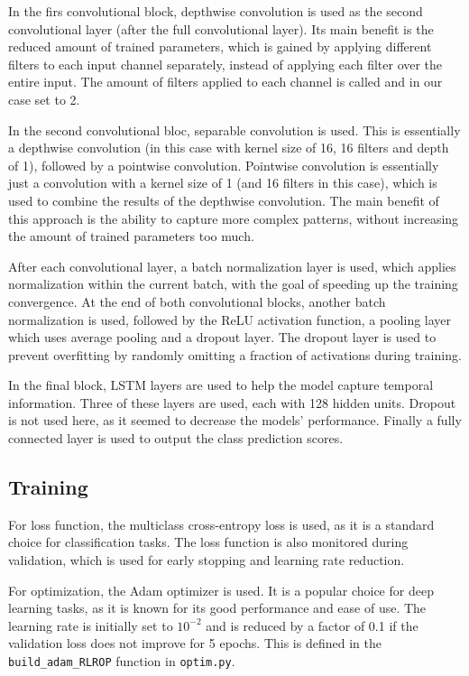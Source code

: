 \documentclass[english, he, bc, kiv, iso690alph, viewonly]{fasthesis}
\begin{document}
In the firs convolutional block, depthwise convolution is used as the second convolutional layer (after the full convolutional layer). Its main benefit is the reduced amount of trained parameters, which is gained by applying different filters to each input channel separately, instead of applying each filter over the entire input. The amount of filters applied to each channel is called  and in our case set to 2.

In the second convolutional bloc, separable convolution is used. This is essentially a depthwise convolution (in this case with kernel size of 16, 16 filters and depth of 1), followed by a pointwise convolution. Pointwise convolution is essentially just a convolution with a kernel size of 1 (and 16 filters in this case), which is used to combine the results of the depthwise convolution. The main benefit of this approach is the ability to capture more complex patterns, without increasing the amount of trained parameters too much.

After each convolutional layer, a batch normalization layer is used, which applies normalization within the current batch, with the goal of speeding up the training convergence. At the end of both convolutional blocks, another batch normalization is used, followed by the ReLU activation function, a pooling layer which uses average pooling and a dropout layer. The dropout layer is used to prevent overfitting by randomly omitting a fraction of activations during training.

In the final block, LSTM layers are used to help the model capture temporal information. Three of these layers are used, each with 128 hidden units. Dropout is not used here, as it seemed to decrease the models' performance. Finally a fully connected layer is used to output the class prediction scores.

\subsection{Training}

For loss function, the multiclass cross-entropy loss is used, as it is a standard choice for classification tasks. The loss function is also monitored during validation, which is used for early stopping and learning rate reduction.

For optimization, the Adam optimizer is used. It is a popular choice for deep learning tasks, as it is known for its good performance and ease of use. The learning rate is initially set to $10^{-2}$ and is reduced by a factor of 0.1 if the validation loss does not improve for 5 epochs. This is defined in the \texttt{build\_adam\_RLROP} function in \texttt{optim.py}.
\end{document}
